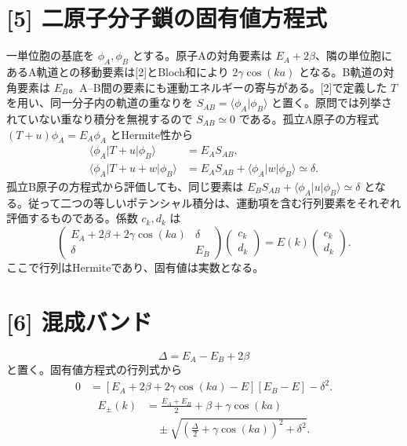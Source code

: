 \documentclass[11pt,a4paper]{article}
\begin{document}
\section*{[5] 二原子分子鎖の固有値方程式}
一単位胞の基底を $\phi_A,\phi_B$ とする。原子Aの対角要素は $E_A+2\beta$、隣の単位胞にあるA軌道との移動要素は[2]とBloch和により $2\gamma\cos(ka)$ となる。B軌道の対角要素は $E_B$。A–B間の要素にも運動エネルギーの寄与がある。[2]で定義した $T$ を用い、同一分子内の軌道の重なりを $S_{AB}=\langle\phi_A|\phi_B\rangle$ と置く。原問では列挙されていない重なり積分を無視するので $S_{AB}\simeq0$ である。孤立A原子の方程式 $(T+u)\phi_A=E_A\phi_A$ とHermite性から
\begin{align}
  \langle\phi_A|T+u|\phi_B\rangle&=E_A S_{AB},\\
  \langle\phi_A|T+u+w|\phi_B\rangle
    &=E_A S_{AB}+\langle\phi_A|w|\phi_B\rangle\simeq\delta.
\end{align}
孤立B原子の方程式から評価しても、同じ要素は $E_B S_{AB}+\langle\phi_A|u|\phi_B\rangle\simeq\delta$ となる。従って二つの等しいポテンシャル積分は、運動項を含む行列要素をそれぞれ評価するものである。係数 $c_k,d_k$ は
\begin{equation}
  \boxed{
  \begin{pmatrix}
    E_A+2\beta+2\gamma\cos(ka)&\delta\\
    \delta&E_B
  \end{pmatrix}
  \begin{pmatrix}c_k\\d_k\end{pmatrix}
  =E(k)\begin{pmatrix}c_k\\d_k\end{pmatrix}.}
\end{equation}
ここで行列はHermiteであり、固有値は実数となる。

\section*{[6] 混成バンド}
\begin{equation}
  \Delta=E_A-E_B+2\beta
\end{equation}
と置く。固有値方程式の行列式から
\begin{align}
  0&=[E_A+2\beta+2\gamma\cos(ka)-E][E_B-E]-\delta^2.
\end{align}
\begin{equation}
  \boxed{\begin{aligned}
  E_{\pm}(k)&=\frac{E_A+E_B}{2}+\beta+\gamma\cos(ka)\\
  &\quad\pm\sqrt{\left(\frac{\Delta}{2}+\gamma\cos(ka)\right)^2+\delta^2}.
  \end{aligned}}
\end{equation}
\end{document}
